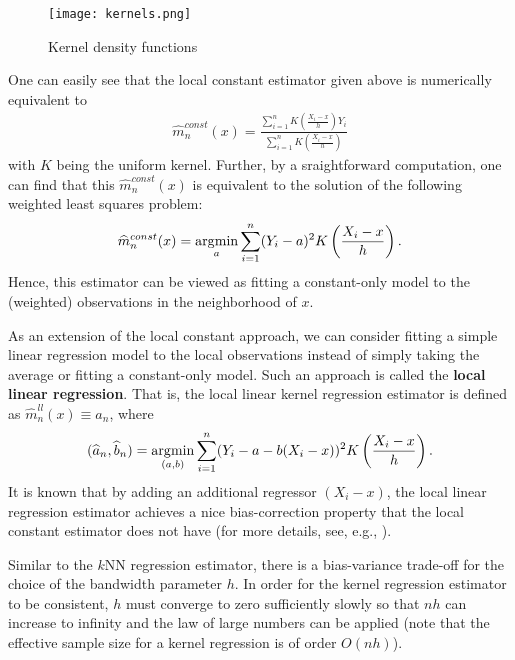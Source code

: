 \documentclass[11pt, A4paper, openany, uplatex]{book}
\begin{document}
\begin{figure}[h!]
	\begin{center}
		\texttt{[image: kernels.png]}
		\caption{Kernel density functions}\label{fig:kernels}
	\end{center}
\end{figure}

One can easily see that the local constant estimator given above is numerically equivalent to
\begin{align*}
	\hat m^{const}_n(x) = \frac{\sum_{i = 1}^n K\left( \frac{X_i - x}{h}\right) Y_i}{\sum_{i = 1}^n K\left( \frac{X_i - x}{h}\right)}
\end{align*}
with $K$ being the uniform kernel.
Further, by a sraightforward computation, one can find that this $\hat m^{const}_n(x)$ is equivalent to the solution of the following weighted least squares problem:
\begin{align*}
	\widehat m^{const}_n(x) = \operatorname*{\arg\!\min}_a \sum_{i = 1}^n (Y_i - a)^2K\left( \frac{X_i - x}{h}\right).
\end{align*}
Hence, this estimator can be viewed as fitting a constant-only model to the (weighted) observations in the neighborhood of $x$.

As an extension of the local constant approach, we can consider fitting a simple linear regression model to the local observations instead of simply taking the average or fitting a constant-only model.
Such an approach is called the \textbf{local linear regression}.
That is, the local linear kernel regression estimator is defined as $\hat m^{ll}_n(x) \equiv \hat a_n$, where
\begin{align*}
	(\widehat a_n, \widehat b_n) = \operatorname*{\arg\!\min}_{(a, b)} \sum_{i = 1}^n (Y_i - a - b (X_i -x))^2K\left( \frac{X_i - x}{h}\right).
\end{align*}
It is known that by adding an additional regressor $(X_i - x)$, the local linear regression estimator achieves a nice bias-correction property that the local constant estimator does not have (for more details, see, e.g., \cite{li2007nonparametric}).

Similar to the $k$NN regression estimator, there is a bias-variance trade-off for the choice of the bandwidth parameter $h$.
In order for the kernel regression estimator to be consistent, $h$ must converge to zero sufficiently slowly so that $nh$ can increase to infinity and the law of large numbers can be applied (note that the effective sample size for a kernel regression is of order $O(nh)$).
\end{document}
